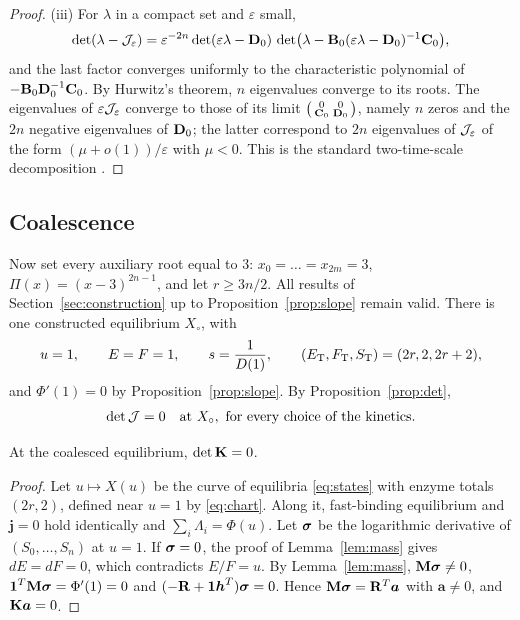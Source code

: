 \begin{proof}
(iii) For \(\lambda\) in a compact set and \(\varepsilon\) small,
\[
 \det(\lambda-\mathcal J_\varepsilon)=\varepsilon^{-2n}\det(\varepsilon\lambda-\mathbf D_0)\,
 \det\bigl(\lambda-\mathbf B_0(\varepsilon\lambda-\mathbf D_0)^{-1}\mathbf C_0\bigr),
\]
and the last factor converges uniformly to the characteristic polynomial of
\(-\mathbf B_0\mathbf D_0^{-1}\mathbf C_0\). By Hurwitz's theorem, \(n\) eigenvalues converge to its roots.
The eigenvalues of \(\varepsilon\mathcal J_\varepsilon\) converge to those of its limit
\(\bigl(\begin{smallmatrix}0&0\\ \mathbf C_0&\mathbf D_0\end{smallmatrix}\bigr)\), namely \(n\) zeros
and the \(2n\) negative eigenvalues of \(\mathbf D_0\); the latter correspond to \(2n\) eigenvalues
of \(\mathcal J_\varepsilon\) of the form \((\mu+o(1))/\varepsilon\) with \(\mu<0\). This is the
standard two-time-scale decomposition \cite[Ch.~2]{KKO}.
\end{proof}

\subsection{Coalescence}
Now set every auxiliary root equal to \(3\): \(x_0=\dots=x_{2m}=3\), \(\Pi(x)=(x-3)^{2n-1}\),
and let \(r\ge3n/2\). All results of Section~\ref{sec:construction} up to
Proposition~\ref{prop:slope} remain valid. There is one constructed equilibrium \(X_\circ\),
with
\begin{equation}\label{eq:coalstate}
 u=1,\qquad E=F=1,\qquad s=\frac1{D(1)},\qquad (E_{\mathrm T},F_{\mathrm T},S_{\mathrm T})=(2r,2,2r+2),
\end{equation}
and \(\Phi'(1)=0\) by Proposition~\ref{prop:slope}. By Proposition~\ref{prop:det},
\begin{equation}\label{eq:detzero}
 \det\mathcal J=0\quad\text{at }X_\circ,\ \text{for every choice of the kinetics.}
\end{equation}

\begin{lemma}\label{lem:Ksingular}
At the coalesced equilibrium, \(\det\mathbf K=0\).
\end{lemma}
\begin{proof}
Let \(u\mapsto X(u)\) be the curve of equilibria \eqref{eq:states} with enzyme totals
\((2r,2)\), defined near \(u=1\) by \eqref{eq:chart}. Along it, fast-binding equilibrium and
\(\boldsymbol j=0\) hold identically and \(\sum_i\Lambda_i=\Phi(u)\). Let \(\boldsymbol\sigma\) be the
logarithmic derivative of \((S_0,\dots,S_n)\) at \(u=1\). If \(\boldsymbol\sigma=0\), the proof of
Lemma~\ref{lem:mass} gives \(dE=dF=0\), which contradicts \(E/F=u\). By Lemma~\ref{lem:mass},
\(\mathbf M\boldsymbol\sigma\ne0\), \(\boldsymbol 1^{T}\mathbf M\boldsymbol\sigma=\Phi'(1)=0\) and \((-\mathbf R+\boldsymbol 1\boldsymbol h^{T})\boldsymbol\sigma=0\). Hence
\(\mathbf M\boldsymbol\sigma=\mathbf R^{T}\boldsymbol a\) with \(\boldsymbol a\ne0\), and \(\mathbf K\boldsymbol a=0\).
\end{proof}

